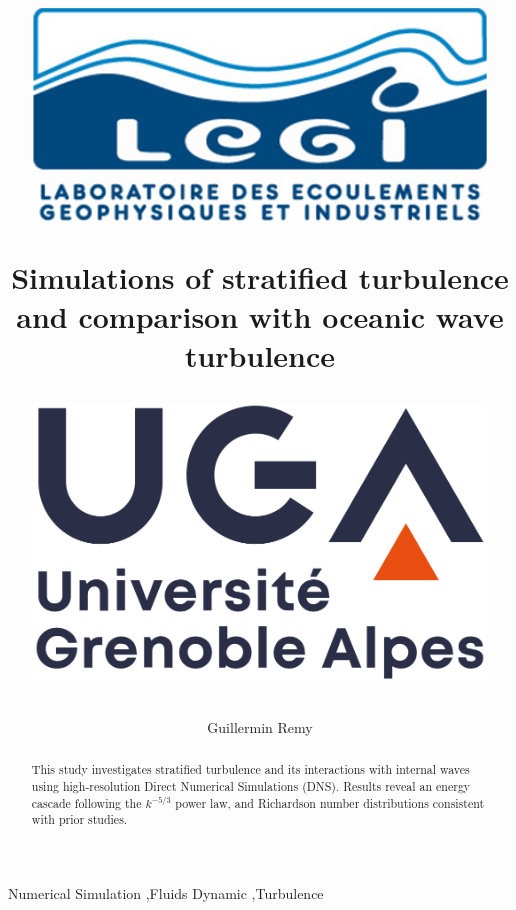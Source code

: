 \documentclass[final,5p,times,twocolumn,authoryear]{elsarticle}
\begin{document}
\begin{frontmatter}

\title{
\begin{minipage}{0.3\textwidth}
\includegraphics[width=0.9\textwidth]{LEGI-logo.png}
\end{minipage}%
\begin{minipage}{0.4\textwidth}
\centering
\textbf{Simulations of stratified turbulence} \\ \textbf{and comparison with oceanic wave turbulence}
\end{minipage}%
\begin{minipage}{0.3\textwidth}
\flushright
\includegraphics[width=0.9\textwidth]{UGA-logo.png}
\end{minipage}
}

\author[first]{Guillermin Remy}

\begin{abstract}
This study investigates stratified turbulence and its interactions with internal waves using high-resolution Direct Numerical Simulations (DNS). Results reveal an energy cascade following the $k^{-5/3}$ power law, and Richardson number distributions consistent with prior studies.
\end{abstract}

\begin{keyword}
Numerical Simulation \sep Fluids Dynamic \sep Turbulence

\end{keyword}

\end{frontmatter}
\end{document}
